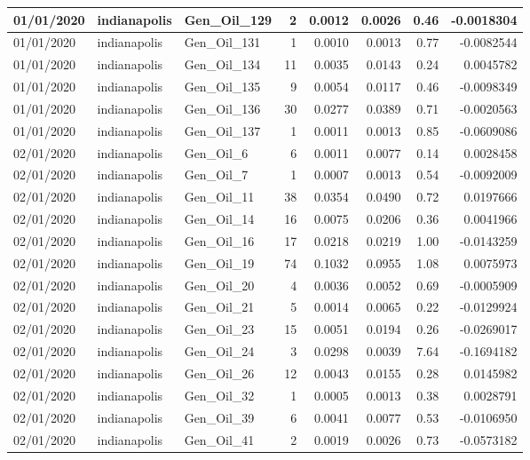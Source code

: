 \documentclass[
  letterpaper,
  DIV=11,
  numbers=noendperiod]{scrartcl}
\begin{document}
\begin{tabular}{l|l|l|r|r|r|r|r}
\hline
01/01/2020 & indianapolis & Gen\_Oil\_129 & 2 & 0.0012 & 0.0026 & 0.46 & -0.0018304\\
\hline
01/01/2020 & indianapolis & Gen\_Oil\_131 & 1 & 0.0010 & 0.0013 & 0.77 & -0.0082544\\
\hline
01/01/2020 & indianapolis & Gen\_Oil\_134 & 11 & 0.0035 & 0.0143 & 0.24 & 0.0045782\\
\hline
01/01/2020 & indianapolis & Gen\_Oil\_135 & 9 & 0.0054 & 0.0117 & 0.46 & -0.0098349\\
\hline
01/01/2020 & indianapolis & Gen\_Oil\_136 & 30 & 0.0277 & 0.0389 & 0.71 & -0.0020563\\
\hline
01/01/2020 & indianapolis & Gen\_Oil\_137 & 1 & 0.0011 & 0.0013 & 0.85 & -0.0609086\\
\hline
02/01/2020 & indianapolis & Gen\_Oil\_6 & 6 & 0.0011 & 0.0077 & 0.14 & 0.0028458\\
\hline
02/01/2020 & indianapolis & Gen\_Oil\_7 & 1 & 0.0007 & 0.0013 & 0.54 & -0.0092009\\
\hline
02/01/2020 & indianapolis & Gen\_Oil\_11 & 38 & 0.0354 & 0.0490 & 0.72 & 0.0197666\\
\hline
02/01/2020 & indianapolis & Gen\_Oil\_14 & 16 & 0.0075 & 0.0206 & 0.36 & 0.0041966\\
\hline
02/01/2020 & indianapolis & Gen\_Oil\_16 & 17 & 0.0218 & 0.0219 & 1.00 & -0.0143259\\
\hline
02/01/2020 & indianapolis & Gen\_Oil\_19 & 74 & 0.1032 & 0.0955 & 1.08 & 0.0075973\\
\hline
02/01/2020 & indianapolis & Gen\_Oil\_20 & 4 & 0.0036 & 0.0052 & 0.69 & -0.0005909\\
\hline
02/01/2020 & indianapolis & Gen\_Oil\_21 & 5 & 0.0014 & 0.0065 & 0.22 & -0.0129924\\
\hline
02/01/2020 & indianapolis & Gen\_Oil\_23 & 15 & 0.0051 & 0.0194 & 0.26 & -0.0269017\\
\hline
02/01/2020 & indianapolis & Gen\_Oil\_24 & 3 & 0.0298 & 0.0039 & 7.64 & -0.1694182\\
\hline
02/01/2020 & indianapolis & Gen\_Oil\_26 & 12 & 0.0043 & 0.0155 & 0.28 & 0.0145982\\
\hline
02/01/2020 & indianapolis & Gen\_Oil\_32 & 1 & 0.0005 & 0.0013 & 0.38 & 0.0028791\\
\hline
02/01/2020 & indianapolis & Gen\_Oil\_39 & 6 & 0.0041 & 0.0077 & 0.53 & -0.0106950\\
\hline
02/01/2020 & indianapolis & Gen\_Oil\_41 & 2 & 0.0019 & 0.0026 & 0.73 & -0.0573182\\

\end{tabular}
\end{document}
